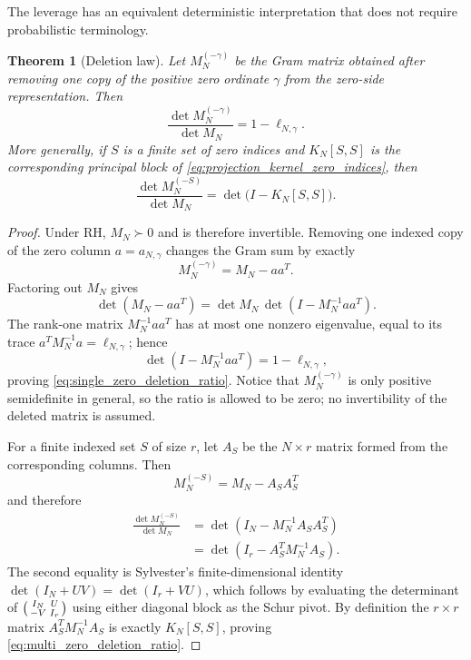 \documentclass[preprint,12pt]{elsarticle}
\numberwithin{equation}{section}
\theoremstyle{plain}
\newtheorem{theorem}{Theorem}[section]
\theoremstyle{definition}
\theoremstyle{remark}
\newcommand{\RH}{\mathrm{RH}}
\begin{document}
The leverage has an equivalent deterministic interpretation that does not require probabilistic terminology.

\begin{theorem}[Deletion law]
\label{thm:zero_deletion_law}
Let $M_N^{(-\gamma)}$ be the Gram matrix obtained after removing one copy of the positive zero ordinate $\gamma$ from the zero-side representation.  Then
\begin{equation}
\boxed{
\frac{\det M_N^{(-\gamma)}}{\det M_N}=1-\ell_{N,\gamma}.}
\label{eq:single_zero_deletion_ratio}
\end{equation}
More generally, if $S$ is a finite set of zero indices and $K_N[S,S]$ is the corresponding principal block of \eqref{eq:projection_kernel_zero_indices}, then
\begin{equation}
\frac{\det M_N^{(-S)}}{\det M_N}
=\det\bigl(I-K_N[S,S]\bigr).
\label{eq:multi_zero_deletion_ratio}
\end{equation}
\end{theorem}

\begin{proof}
Under $\RH$, $M_N\succ0$ and is therefore invertible.  Removing one indexed copy of the zero column $a=a_{N,\gamma}$ changes the Gram sum by exactly
\begin{equation}
M_N^{(-\gamma)}=M_N-aa^T.
\end{equation}
Factoring out $M_N$ gives
\begin{equation}
\det(M_N-aa^T)=\det M_N\,\det(I-M_N^{-1}aa^T).
\end{equation}
The rank-one matrix $M_N^{-1}aa^T$ has at most one nonzero eigenvalue, equal to its trace $a^TM_N^{-1}a=\ell_{N,\gamma}$; hence
\begin{equation}
\det(I-M_N^{-1}aa^T)=1-\ell_{N,\gamma},
\end{equation}
proving \eqref{eq:single_zero_deletion_ratio}.  Notice that $M_N^{(-\gamma)}$ is only positive semidefinite in general, so the ratio is allowed to be zero; no invertibility of the deleted matrix is assumed.

For a finite indexed set $S$ of size $r$, let $A_S$ be the $N\times r$ matrix formed from the corresponding columns.  Then
\begin{equation}
M_N^{(-S)}=M_N-A_SA_S^T
\end{equation}
and therefore
\begin{align}
\frac{\det M_N^{(-S)}}{\det M_N}
&=\det(I_N-M_N^{-1}A_SA_S^T)\\
&=\det(I_r-A_S^TM_N^{-1}A_S).
\end{align}
The second equality is Sylvester's finite-dimensional identity $\det(I_N+UV)=\det(I_r+VU)$, which follows by evaluating the determinant of
$\begin{psmallmatrix}I_N&U\\-V&I_r\end{psmallmatrix}$ using either diagonal block as the Schur pivot.  By definition the $r\times r$ matrix $A_S^TM_N^{-1}A_S$ is exactly $K_N[S,S]$, proving \eqref{eq:multi_zero_deletion_ratio}.
\end{proof}
\end{document}
